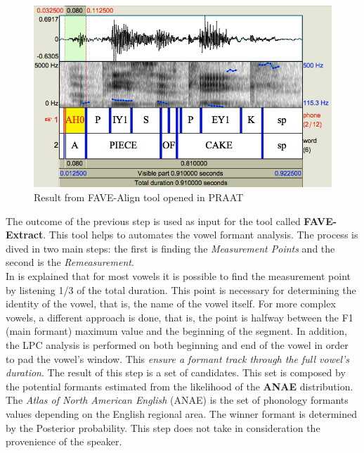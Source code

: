 \begin{figure}[!ht]
	\centering
	\includegraphics[scale=0.4]{Figures/fave_align.png}
	\caption{Result from FAVE-Align tool opened in PRAAT}
	\label{fig:fave-align_result}
\end{figure}

\noindent The outcome of the previous step is used as input for the tool called \textbf{FAVE-Extract}. This tool helps to automates the vowel formant analysis. The process is dived in two main steps: the first is finding the \textit{Measurement Points} and the second is the \textit{Remeasurement}. \\

\noindent In \cite{rosenfelder2011fave} is explained that for most vowels it is possible to find the measurement point by listening 1/3 of the total duration. This point is necessary for determining the identity of the vowel, that is, the name of the vowel itself. For more complex vowels, a different approach is done, that is, the point is halfway between the F1 (main formant) maximum value and the beginning of the segment. In addition, the LPC analysis is performed on both beginning and end of the vowel in order to pad the vowel's window. This \emph{ensure a formant track through the full vowel's duration}\cite{harrison2004variability}. The result of this step is a set of candidates. This set is composed by the potential formants estimated from the likelihood of the \textbf{ANAE} distribution. The \textit{Atlas of North American English} (ANAE) is the set of phonology formants values depending on the English regional area. The winner formant is determined by the Posterior probability. This step does not take in consideration the provenience of the speaker. \\

